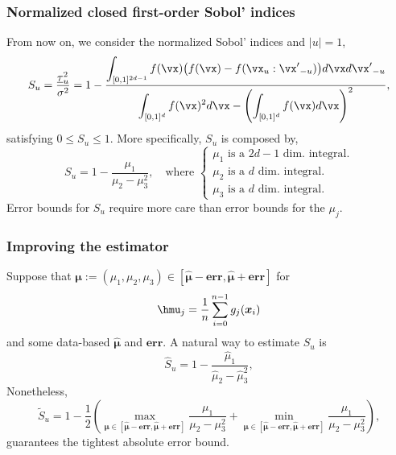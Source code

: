 \documentclass[11pt,compress]{beamer} %
\begin{document}
\begin{frame}
\frametitle{Normalized closed first-order Sobol' indices}
From now on, we consider the normalized Sobol' indices and $|u|=1$,
\begin{gather*}
S_{u}=\frac{\underline{\tau}_u^{2}}{\sigma^2}=1-\frac{\displaystyle 
\int_{[0,1]^{2d-1}}f(\vx)\bigl(f(\vx)-f(\vx_u:{\vx'}_{-u})\bigr)
 d\vx d{\vx'}_{-u}}{\displaystyle \int_{[0,1]^d} f(\vx)^2 d{\vx}-\left(\int_{[0,1]^d} f(\vx) 
 d{\vx}\right)^2},
\end{gather*}
satisfying $
0\leq S_{u} \leq 1$. More specifically, $S_{u}$ is composed by,
\vspace{-0.2cm}
\begin{equation*}
S_{u}=1-\frac{\mu_1}{\mu_2-\mu_3^2},\quad \text{where }\begin{cases}\mu_1\text{ is a 
}2d-1\text{ dim. integral.} \\ \mu_2\text{ is a }d\text{ dim. integral.} \\ \mu_3\text{ is a 
}d\text{ dim. integral.} \end{cases}
\end{equation*}
\vspace{-0.3cm}
Error bounds for $S_{u}$ require more care than error bounds for the $\mu_j$.
\end{frame}

\begin{frame}
\frametitle{Improving the estimator}
Suppose that $\boldsymbol{\mu}:=(\mu_1, \mu_2, \mu_3) \in  
[\widehat{\boldsymbol{\mu}}-\textbf{err}, \widehat{\boldsymbol{\mu}}+\textbf{err}]$ for 
\[
\hmu_j = \frac 1n \sum_{i=0}^{n-1} g_j(\boldsymbol{x}_i)
\]
and some data-based $\widehat{\boldsymbol{\mu}}$ and $\textbf{err}$. A 
natural way to estimate $S_{u}$ is 
\begin{equation*}
\widehat{S}_{u} = 1 - \frac{\widehat{\mu}_1}{\widehat{\mu}_2-\widehat{\mu}_3^2},
\end{equation*}
Nonetheless, 
\begin{equation*}
\widetilde{S}_{u}=1 - \frac{1}{2}\left(\max_{\boldsymbol{\mu} \in  
[\boldsymbol{\widehat{\mu}}-\textbf{err}, 
\boldsymbol{\widehat{\mu}}+\textbf{err}]}\frac{\mu_1}{\mu_2-\mu_3^2} + 
\min_{\boldsymbol{\mu} \in  [\boldsymbol{\widehat{\mu}}-\textbf{err}, 
\boldsymbol{\widehat{\mu}}+\textbf{err}]}\frac{\mu_1}{\mu_2-\mu_3^2} \right),
\end{equation*}
guarantees the tightest absolute error bound.
\end{frame}
\end{document}
